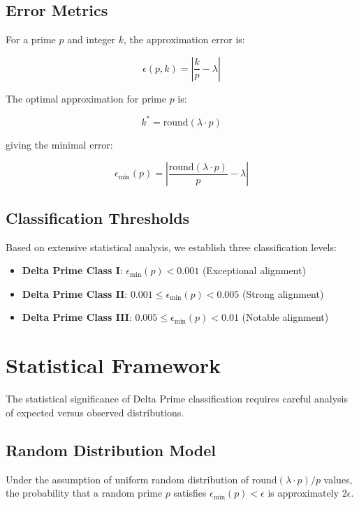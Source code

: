 \documentclass[12pt,a4paper]{report}
\newcommand{\lambdaval}{\lambda}
\begin{document}
\subsection{Error Metrics}

For a prime $p$ and integer $k$, the approximation error is:

\[
\epsilon(p,k) = \left| \frac{k}{p} - \lambdaval \right|
\]

The optimal approximation for prime $p$ is:

\[
k^* = \text{round}(\lambdaval \cdot p)
\]

giving the minimal error:

\[
\epsilon_{\min}(p) = \left| \frac{\text{round}(\lambdaval \cdot p)}{p} - \lambdaval \right|
\]

\subsection{Classification Thresholds}

Based on extensive statistical analysis, we establish three classification levels:

\begin{itemize}
\item \textbf{Delta Prime Class I}: $\epsilon_{\min}(p) < 0.001$ (Exceptional alignment)
\item \textbf{Delta Prime Class II}: $0.001 \leq \epsilon_{\min}(p) < 0.005$ (Strong alignment)
\item \textbf{Delta Prime Class III}: $0.005 \leq \epsilon_{\min}(p) < 0.01$ (Notable alignment)
\end{itemize}

\section{Statistical Framework}

The statistical significance of Delta Prime classification requires careful analysis of expected versus observed distributions.

\subsection{Random Distribution Model}

Under the assumption of uniform random distribution of $\text{round}(\lambdaval \cdot p) / p$ values, the probability that a random prime $p$ satisfies $\epsilon_{\min}(p) < \epsilon$ is approximately $2\epsilon$.
\end{document}
